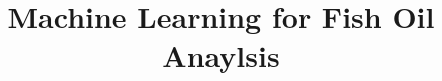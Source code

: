 \documentclass[runningheads]{llncs}
\begin{document}
%
\title{Machine Learning for Fish Oil Anaylsis}
%
%
%
\end{document}
